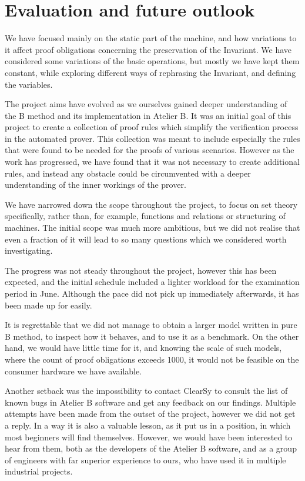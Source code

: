 \documentclass[12pt,journal,duplex]{IEEEtran}
\begin{document}
	\section{Evaluation and future outlook}
	We have focused mainly on the static part of the machine, and how variations to it affect proof obligations concerning the preservation of the Invariant. We have considered some variations of the basic operations, but mostly we have kept them constant, while exploring different ways of rephrasing the Invariant, and defining the variables.

	The project aims have evolved as we ourselves gained deeper understanding of the B method and its implementation in Atelier B. It was an initial goal of this project to create a collection of proof rules which simplify the verification process in the automated prover. This collection was meant to include especially the rules that were found to be needed for the proofs of various scenarios. However as the work has progressed, we have found that it was not necessary to create additional rules, and instead any obstacle could be circumvented with a deeper understanding of the inner workings of the prover.

	We have narrowed down the scope throughout the project, to focus on set theory specifically, rather than, for example, functions and relations or structuring of machines. The initial scope was much more ambitious, but we did not realise that even a fraction of it will lead to so many questions which we considered worth investigating.

	The progress was not steady throughout the project, however this has been expected, and the initial schedule included a lighter workload for the examination period in June. Although the pace did not pick up immediately afterwards, it has been made up for easily.

	It is regrettable that we did not manage to obtain a larger model written in pure B method, to inspect how it behaves, and to use it as a benchmark. On the other hand, we would have little time for it, and knowing the scale of such models, where the count of proof obligations exceeds 1000, it would not be feasible on the consumer hardware we have available.

	Another setback was the impossibility to contact ClearSy to consult the list of known bugs in Atelier B software and get any feedback on our findings. Multiple attempts have been made from the outset of the project, however we did not get a reply. In a way it is also a valuable lesson, as it put us in a position, in which most beginners will find themselves. However, we would have been interested to hear from them, both as the developers of the Atelier B software, and as a group of engineers with far superior experience to ours, who have used it in multiple industrial projects.
\end{document}
